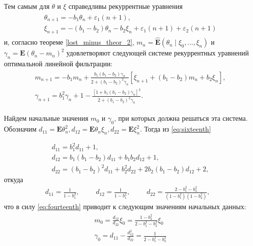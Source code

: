 \begin{example}
	Тем самым для $\theta$ и $\xi$ справедливы рекуррентные уравнения
	\begin{align}
	\label{eq:sixteenth}
	\begin{split}
	& \theta_{n+1} = -b_1\theta_n + \varepsilon_1 (n + 1), \\
	& \xi_{n+1} = -(b_1 - b_2)\theta_n - b_2\xi_n + \varepsilon_1 (n + 1) + \varepsilon_2 (n + 1) 
	\end{split}
	\end{align}
	и, согласно теореме \ref{lost_minus_theor_2}, $m_n = \mathbf{\hat{E}} (\theta_n \mid \xi_0, ..., \xi_n)$ и $\gamma_n = \mathbf{E} (\theta_n - m_n)^2$ удовлетворяют следующей системе рекуррентных уравнений оптимальной линейной фильтрации:
	\begin{align}
	\label{eq:seventeenth}
	\begin{split}
	& m_{n+1} = -b_1 m_n + \frac{b_1 (b_1 - b_2)\gamma_n}{2 + (b_1 - b_2)^2\gamma_n}[\xi_{n+1} + (b_1 - b_2)m_n + b_2 \xi_n],\\
	& \gamma_{n+1} = b_1^2 \gamma_n + 1 - \frac{[1 + b_1 (b_1 - b_2)\gamma_n]^2}{2 + (b_1 - b_2)^2\gamma_n}.
	\end{split}
	\end{align}

	Найдем начальные значения $m_0$ и $\gamma_0$, при которых должна решаться эта система. Обозначим $d_{11} = \mathbf{E}\theta^2_n, d_{12} = \mathbf{E}\theta_n \xi_n, d_{22} = \mathbf{E}\xi^2_n$. Тогда из \eqref{eq:sixteenth}
	
	\begin{align*}
	& d_{11} = b^2_1 d_{11} + 1,\\
	& d_{12} = b_1 (b_1 - b_2)d_{11} + b_1 b_2 d_{12} + 1,\\
	& d_{22} = (b_1 - b_2)^2 d_{11} + b_2^2 d_{22} + 2b_2 (b_1 - b_2)d_{12} + 2,
	\end{align*}
	откуда
	\begin{align*}
	d_{11} = \frac{1}{1 - b^2_1}, \hspace{1cm} d_{12} = \frac{1}{1 - b^2_1}, \hspace{1cm}
	d_{22} = \frac{2 - b_1^2 - b_2^2}{(1 - b^2_1)(1 - b^2_2)},
	\end{align*}
	что в силу \eqref{eq:fourteenth} приводит к следующим значениям начальных данных:
	\begin{align}
	\label{eq:eighteenth}
	\begin{split}
	& m_0 = \frac{d_{12}}{d_{22}}\xi_0 = \frac{1 - b^2_2}{2 - b_1^2 - b_2^2} \xi_0 \\
	& \gamma_0 = d_{11} - \frac{d^2_{12}}{d_{22}} = \frac{1}{2 - b_1^2 - b_2^2}
	\end{split}
	\end{align}


\end{example}
